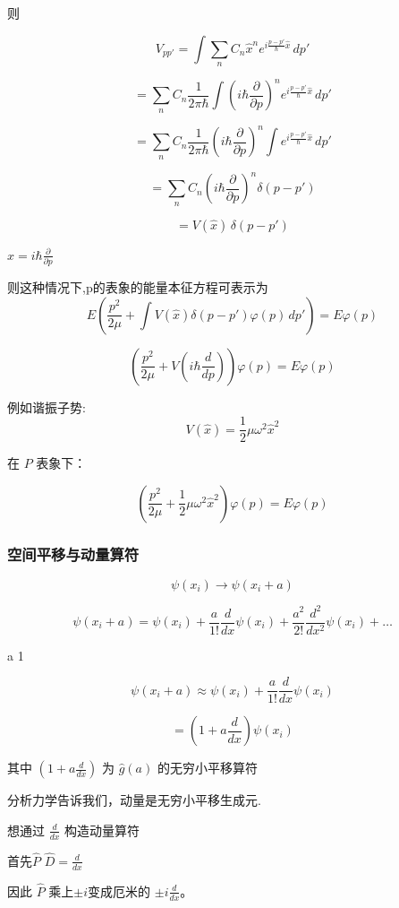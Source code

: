 \documentclass[lang=cn,10pt]{elegantbook}
\begin{document}
则 

\[
V_{pp'} = \int \sum_n C_n \hat{x}^n e^{i \frac{p-p'}{\hbar} \hat{x}} \, dp'
\]

\[
= \sum_n C_n \frac{1}{2\pi \hbar} \int (i \hbar \frac{\partial}{\partial p})^n e^{i \frac{p - p'}{\hbar} \hat{x}} \, dp'
\]

\[
= \sum_n C_n \frac{1}{2\pi \hbar}(i \hbar \frac{\partial}{\partial p})^n\int e^{i \frac{p - p'}{\hbar} \hat{x}} \, dp'
\]

\[
= \sum_n C_n(i \hbar \frac{\partial}{\partial p})^n \delta(p - p')
\]

\[
= V(\hat{x}) \, \delta(p - p')
\]

 $\hat{x} = i \hbar \frac{\partial}{\partial p}$

则这种情况下,p的表象的能量本征方程可表示为
\[
E \left( \frac{p^2}{2\mu} + \int V(\hat{x}) \delta(p - p')  \varphi(p)\, dp' \right) = E \varphi(p)
\]

\[
\left( \frac{p^2}{2\mu} + V(i \hbar \frac{d}{dp}) \right)  \varphi(p) = E  \varphi(p)
\]


例如谐振子势:
\[
V(\hat{x}) =  \frac{1}{2} \mu \omega^2 \hat{x}^2
\]

在 $P$ 表象下：

\[
\left( \frac{p^2}{2\mu} + \frac{1}{2} \mu \omega^2 \hat{x}^2 \right) \varphi(p) = E \varphi(p)
\]

\subsubsection{空间平移与动量算符}
\[
\psi(x_i) \rightarrow \psi(x_i + a)
\]

\[
\psi(x_i + a) = \psi(x_i) + \frac{a}{1!} \frac{d}{dx} \psi(x_i) + \frac{a^2}{2!} \frac{d^2}{dx^2} \psi(x_i) + \ldots
\]

 a  1 

\[
\psi(x_i + a) \approx \psi(x_i) + \frac{a}{1!} \frac{d}{dx} \psi(x_i)
\]

\[
= (1 + a \frac{d}{dx}) \psi(x_i)
\]

$\text{其中 } (1 + a \frac{d}{dx}) \text{ 为 } \hat{g}(a) \text{ 的无穷小平移算符}$

分析力学告诉我们，动量是无穷小平移生成元.

想通过 $\frac{d}{dx}$ 构造动量算符

首先$  \hat{P}$ $ \hat{D} = \frac{d}{dx}$ 

因此 $\hat{P}$ 乘上$\pm i$变成厄米的 $\pm i \frac{d}{dx}$。
\end{document}
